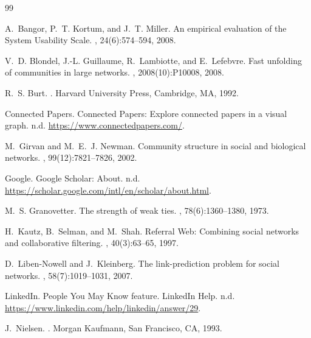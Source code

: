 \documentclass[10pt,twocolumn,letterpaper]{article}
\begin{document}
\begin{thebibliography}{99}\footnotesize\raggedright
\setlength{\itemsep}{1.2pt}\setlength{\parskip}{0pt}

A.~Bangor, P.~T. Kortum, and J.~T. Miller.
\newblock An empirical evaluation of the System Usability Scale.
, 24(6):574--594, 2008.

V.~D. Blondel, J.-L. Guillaume, R.~Lambiotte, and E.~Lefebvre.
\newblock Fast unfolding of communities in large networks.
, 2008(10):P10008, 2008.

R.~S. Burt.
.
\newblock Harvard University Press, Cambridge, MA, 1992.

Connected Papers.
\newblock Connected Papers: Explore connected papers in a visual graph. n.d.
\newblock \url{https://www.connectedpapers.com/}.

M.~Girvan and M.~E.~J. Newman.
\newblock Community structure in social and biological networks.
, 99(12):7821--7826, 2002.

Google.
\newblock Google Scholar: About. n.d.
\newblock \url{https://scholar.google.com/intl/en/scholar/about.html}.

M.~S. Granovetter.
\newblock The strength of weak ties.
, 78(6):1360--1380, 1973.

H.~Kautz, B.~Selman, and M.~Shah.
\newblock Referral Web: Combining social networks and collaborative filtering.
, 40(3):63--65, 1997.

D.~Liben-Nowell and J.~Kleinberg.
\newblock The link-prediction problem for social networks.
, 58(7):1019--1031, 2007.

LinkedIn.
\newblock People You May Know feature. LinkedIn Help. n.d.
\newblock \url{https://www.linkedin.com/help/linkedin/answer/29}.

J.~Nielsen.
.
\newblock Morgan Kaufmann, San Francisco, CA, 1993.


\end{thebibliography}
\end{document}

